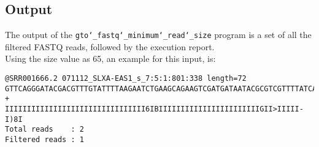 \subsection*{Output}
The output of the \texttt{gto\char`_fastq\char`_minimum\char`_read\char`_size} program is a set of all the filtered FASTQ reads, followed by the execution report.\\
Using the size value as 65, an example for this input, is:
\begin{lstlisting}
@SRR001666.2 071112_SLXA-EAS1_s_7:5:1:801:338 length=72
GTTCAGGGATACGACGTTTGTATTTTAAGAATCTGAAGCAGAAGTCGATGATAATACGCGTCGTTTTATCAT
+
IIIIIIIIIIIIIIIIIIIIIIIIIIIIIIII6IBIIIIIIIIIIIIIIIIIIIIIIIGII>IIIII-I)8I
Total reads    : 2
Filtered reads : 1
\end{lstlisting}
